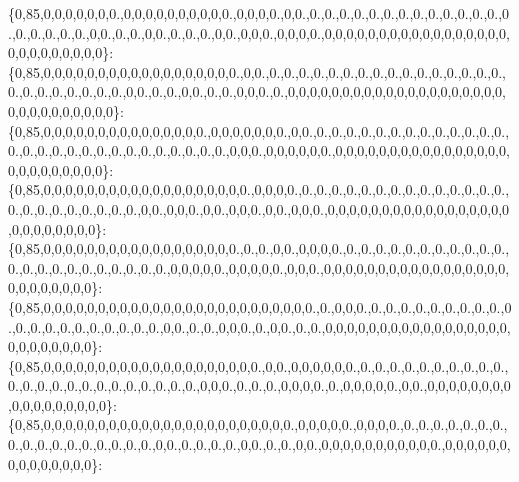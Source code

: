 \{0,85,0,0,0,0,0,0,0.,0,0,0,0,0,0,0,0,0,0.,0,0,0,0.,0,0.,0.,0.,0.,0.,0.,0.,0.,0.,0.,0.,0.,0.,0.,0.,0.,0.,0.,0.,0.,0,0.,0.,0.,0,0.,0.,0.,0.,0,0.,0,0,0.,0,0,0,0.,0,0,0,0,0,0,0,0,0,0,0,0,0,0,0,0,0,0,0,0,0,0,0,0,0,0\}\+: \{0,85,0,0,0,0,0,0,0,0,0,0,0,0,0,0,0,0,0,0.,0,0.,0.,0.,0.,0.,0.,0.,0.,0.,0.,0.,0.,0.,0.,0.,0.,0.,0.,0.,0.,0.,0.,0.,0.,0.,0,0.,0.,0.,0,0.,0.,0.,0,0,0.,0.,0,0,0,0,0,0,0,0,0,0,0,0,0,0,0,0,0,0,0,0,0,0,0,0,0,0,0,0,0,0\}\+: \{0,85,0,0,0,0,0,0,0,0,0,0,0,0,0,0,0.,0,0,0,0,0,0,0.,0,0.,0.,0.,0.,0.,0.,0.,0.,0.,0.,0.,0.,0.,0.,0.,0.,0.,0.,0.,0.,0.,0.,0.,0.,0.,0.,0.,0.,0.,0,0,0.,0,0,0,0,0,0.,0,0,0,0,0,0,0,0,0,0,0,0,0,0,0,0,0,0,0,0,0,0,0,0,0\}\+: \{0,85,0,0,0,0,0,0,0,0,0,0,0,0,0,0,0,0,0,0,0.,0,0,0,0.,0.,0.,0.,0.,0.,0.,0.,0.,0.,0.,0.,0.,0.,0.,0.,0.,0.,0.,0.,0.,0.,0.,0.,0,0.,0,0,0.,0,0.,0,0,0.,0,0.,0,0,0.,0,0,0,0,0,0,0,0,0,0,0,0,0,0,0,0,0,0,0,0,0,0,0,0,0\}\+: \{0,85,0,0,0,0,0,0,0,0,0,0,0,0,0,0,0,0,0,0.,0.,0.,0,0.,0,0,0,0.,0.,0.,0.,0.,0.,0.,0.,0.,0.,0.,0.,0.,0.,0.,0.,0.,0.,0.,0.,0.,0.,0.,0,0,0,0,0.,0,0,0,0,0.,0,0,0.,0,0,0,0,0,0,0,0,0,0,0,0,0,0,0,0,0,0,0,0,0,0,0,0,0\}\+: \{0,85,0,0,0,0,0,0,0,0,0,0,0,0,0,0,0,0,0,0,0,0,0,0,0,0,0.,0.,0,0,0.,0.,0.,0.,0.,0.,0.,0.,0.,0.,0.,0.,0.,0.,0.,0.,0.,0.,0.,0.,0.,0,0.,0.,0.,0,0,0.,0.,0,0.,0.,0.,0,0,0,0,0,0,0,0,0,0,0,0,0,0,0,0,0,0,0,0,0,0,0,0,0\}\+: \{0,85,0,0,0,0,0,0,0,0,0,0,0,0,0,0,0,0,0,0,0,0.,0,0.,0,0,0,0,0,0.,0.,0.,0.,0.,0.,0.,0.,0.,0.,0.,0.,0.,0.,0.,0.,0.,0.,0.,0.,0.,0.,0.,0.,0,0,0.,0.,0.,0.,0,0,0,0.,0.,0,0,0,0,0.,0,0.,0,0,0,0,0,0,0,0,0,0,0,0,0,0,0,0,0\}\+: \{0,85,0,0,0,0,0,0,0,0,0,0,0,0,0,0,0,0,0,0,0,0,0,0,0.,0,0,0,0,0.,0,0,0,0.,0.,0.,0.,0.,0.,0.,0.,0.,0.,0.,0.,0.,0.,0.,0.,0.,0.,0,0.,0.,0.,0.,0.,0,0.,0.,0.,0,0.,0,0,0,0,0,0,0,0,0,0,0.,0,0,0,0,0,0,0,0,0,0,0,0,0,0\}\+: 